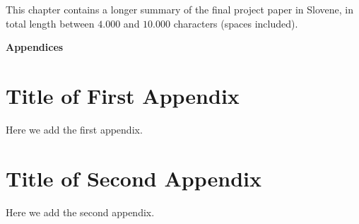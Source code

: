 \documentclass[12pt,a4paper,titlepage,openany]{report}
\begin{document}
This chapter contains a longer summary of the final project paper in Slovene,
in total length between $4.000$ and $10.000$ characters (spaces included).

\newpage

\pagestyle{fancyplain}
\vspace*{\fill}
     \begin{center}
          \bf{\Huge{Appendices}}
     \end{center}
\vspace*{\fill}
\thispagestyle{fancy}

\appendix
\thispagestyle{empty}

\chapter{Title of First Appendix}
\thispagestyle{empty}
Here we add the first appendix.


\chapter{Title of Second Appendix}
\thispagestyle{empty}
Here we add the second appendix.


\end{document}
